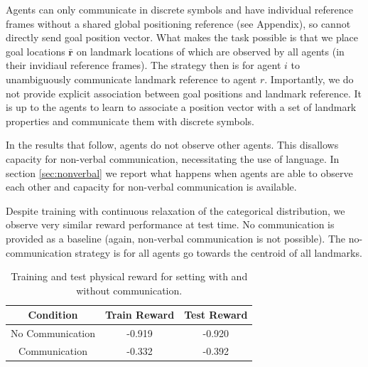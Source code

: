 \documentclass[letterpaper]{article} %
\newcommand{\inserttable}[4]{
\begin{table}[h!]
\centering
\begin{tabular}{#2}
#3
\end{tabular}
\caption{#4}
\label{table:#1}
\end{table}
}
\begin{document}
Agents can only communicate in discrete symbols and have individual reference frames without a shared global positioning reference (see Appendix), so cannot directly send goal position vector. What makes the task possible is that we place goal locations $\bar{\mathbf{r}}$ on landmark locations of which are observed by all agents (in their invidiaul reference frames). The strategy then is for agent $i$ to unambiguously communicate landmark reference to agent $r$. Importantly, we do not provide explicit association between goal positions and landmark reference. It is up to the agents to learn to associate a position vector with a set of landmark properties and communicate them with discrete symbols.

In the results that follow, agents do not observe other agents. This disallows capacity for non-verbal communication, necessitating the use of language. In section \ref{sec:nonverbal} we report what happens when agents are able to observe each other and capacity for non-verbal communication is available.

Despite training with continuous relaxation of the categorical distribution, we observe very similar reward performance at test time. No communication is provided as a baseline (again, non-verbal communication is not possible). The no-communication strategy is for all agents go towards the centroid of all landmarks.
\inserttable{reward}{|c|c|c|}{
\hline
\textbf{Condition} & \textbf{Train Reward} & \textbf{Test Reward} \\
\hline
No Communication & -0.919 & -0.920 \\
\hline
Communication & -0.332 & -0.392 \\
\hline
}{Training and test physical reward for setting with and without communication.}
\end{document}
